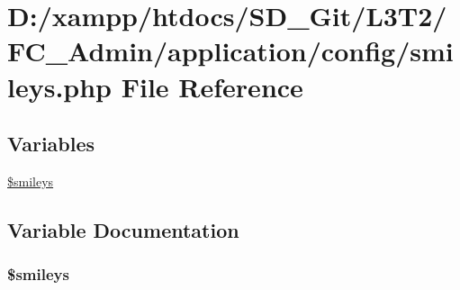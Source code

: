 \hypertarget{smileys_8php}{}\section{D\+:/xampp/htdocs/\+S\+D\+\_\+\+Git/\+L3\+T2/\+F\+C\+\_\+\+Admin/application/config/smileys.php File Reference}
\label{smileys_8php}
\subsection*{Variables}
\begin{DoxyCompactItemize}
\item 
\hyperlink{smileys_8php_a3f21d1c0fb54cb2010e7c7004f29f74c}{\$smileys}
\end{DoxyCompactItemize}


\subsection{Variable Documentation}
\hypertarget{smileys_8php_a3f21d1c0fb54cb2010e7c7004f29f74c}{}
\subsubsection[{\$smileys}]{\setlength{\rightskip}{0pt plus 5cm}\$smileys}\label{smileys_8php_a3f21d1c0fb54cb2010e7c7004f29f74c}
